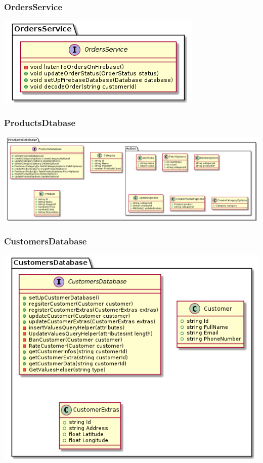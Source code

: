 \documentclass{article}
\begin{document}
\subsubsection{OrdersService}
\includegraphics[scale=1]{./out/NodeApp/OrdersService/OrdersService.png}

\subsubsection{ProductsDtabase}
\includegraphics[scale=0.38]{./out/NodeApp/Database/ProductsDatabase.png}

\subsubsection{CustomersDatabase}
\includegraphics[scale=0.75]{./out/NodeApp/Database/CustomersDatabase.png}
\end{document}
